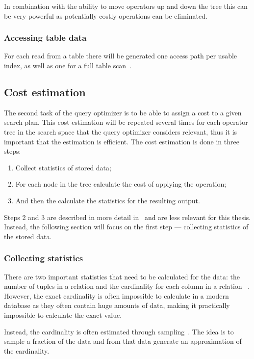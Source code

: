 In combination with the ability to move operators up and down the tree this can
be very powerful as potentially costly operations can be eliminated.

\subsubsection{Accessing table data}
For each read from a table there will be generated one access path per usable
index, as well as one for a full table
scan~\cite[p.~827-829]{garcia-molina_2002_database_dstcb}.

\subsection{Cost estimation}
The second task of the query optimizer is to be able to assign a cost to a given
search plan. This cost estimation will be repeated several times for each
operator tree in the search space that the query optimizer considers relevant,
thus it is important that the estimation is efficient. The cost estimation is
done in three steps:
\begin{enumerate}
\item Collect statistics of stored data;
\item For each node in the tree calculate the cost of applying the operation;
\item And then the calculate the statistics for the resulting output.
\end{enumerate}

Steps 2 and 3 are described in more detail
in~\cite{chaudhuri_1998_overview_aooqoirs} and are less relevant for this
thesis. Instead, the following section will focus on the first step ---
collecting statistics of the stored data.

\subsubsection{Collecting statistics}\label{sec:collecting_statistics}
There are two important statistics that need to be calculated for the data: the
number of tuples in a relation and the cardinality for each column in a relation
~\cite[p.~807-808]{garcia-molina_2002_database_dstcb}. However, the exact
cardinality is often impossible to calculate in a modern database as they often
contain huge amounts of data, making it practically impossible to calculate the
exact value.

Instead, the cardinality is often estimated through
sampling~\cite[p.~807-808]{garcia-molina_2002_database_dstcb}. The idea is to
sample a fraction of the data and from that data generate an approximation of
the cardinality.


